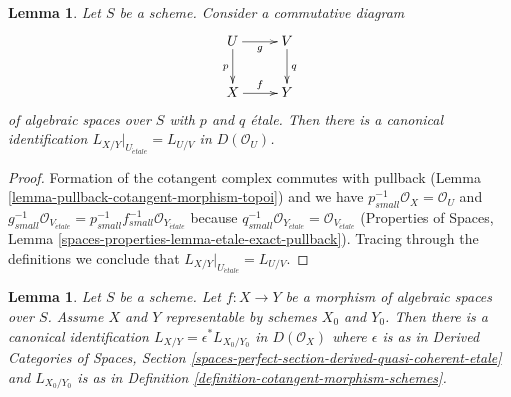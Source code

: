 \documentclass{stacks-project}
\theoremstyle{plain}
\newtheorem{lemma}[subsection]{Lemma}
\theoremstyle{definition}
\theoremstyle{remark}
\numberwithin{equation}{subsection}
\def\etale{{\acute{e}tale}}
\begin{document}
\begin{lemma}
\label{lemma-etale-localization}
Let $S$ be a scheme. Consider a commutative diagram
$$
\xymatrix{
U \ar[d]_p \ar[r]_g & V \ar[d]^q \\
X \ar[r]^f & Y
}
$$
of algebraic spaces over $S$ with $p$ and $q$ \'etale.
Then there is a canonical identification
$L_{X/Y}|_{U_\etale} = L_{U/V}$ in $D(\mathcal{O}_U)$.
\end{lemma}

\begin{proof}
Formation of the cotangent complex commutes with pullback
(Lemma \ref{lemma-pullback-cotangent-morphism-topoi}) and
we have $p_{small}^{-1}\mathcal{O}_X = \mathcal{O}_U$ and
$g_{small}^{-1}\mathcal{O}_{V_\etale} =
p_{small}^{-1}f_{small}^{-1}\mathcal{O}_{Y_\etale}$
because $q_{small}^{-1}\mathcal{O}_{Y_\etale} =
\mathcal{O}_{V_\etale}$
(Properties of Spaces, Lemma
\ref{spaces-properties-lemma-etale-exact-pullback}).
Tracing through the definitions we conclude that
$L_{X/Y}|_{U_\etale} = L_{U/V}$.
\end{proof}

\begin{lemma}
\label{lemma-compare-spaces-schemes}
Let $S$ be a scheme. Let $f : X \to Y$ be a morphism of algebraic spaces
over $S$. Assume $X$ and $Y$ representable by schemes $X_0$ and $Y_0$.
Then there is a canonical identification
$L_{X/Y} = \epsilon^*L_{X_0/Y_0}$ in $D(\mathcal{O}_X)$
where $\epsilon$ is as in Derived Categories of Spaces, Section
\ref{spaces-perfect-section-derived-quasi-coherent-etale}
and $L_{X_0/Y_0}$ is as in
 Definition \ref{definition-cotangent-morphism-schemes}.
\end{lemma}
\end{document}
